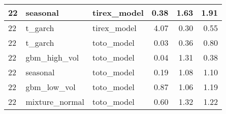 {\begin{tabular}{lllrrr}
\midrule
22 & seasonal & tirex\_model & 0.38 & 1.63 & 1.91 \\
\midrule
22 & t\_garch & tirex\_model & 4.07 & 0.30 & 0.55 \\
\midrule
22 & t\_garch & toto\_model & 0.03 & 0.36 & 0.80 \\
\midrule
22 & gbm\_high\_vol & toto\_model & 0.04 & 1.31 & 0.38 \\
\midrule
22 & seasonal & toto\_model & 0.19 & 1.08 & 1.10 \\
\midrule
22 & gbm\_low\_vol & toto\_model & 0.87 & 1.06 & 1.19 \\
\midrule
22 & mixture\_normal & toto\_model & 0.60 & 1.32 & 1.22 \\
\bottomrule
\end{tabular}
}